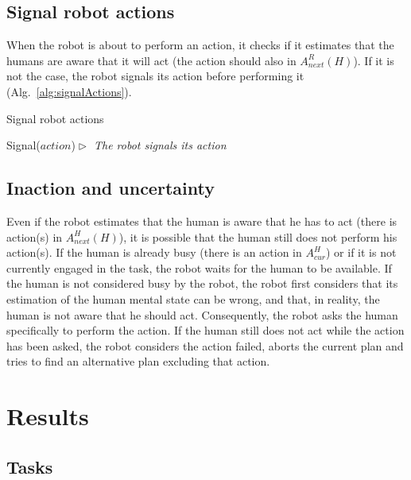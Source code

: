 \documentclass[english,a4paper,11pt,twoside]{StyleThese}
\begin{document}
\subsection{Signal robot actions}

When the robot is about to perform an action, it checks if it estimates that the humans are aware that it will act (the action should also in $A^R_{next}(H)$). If it is not the case, the robot signals its action before performing it (Alg.~\ref{alg:signalActions}).

\begin{algorithm}
\caption{Signal robot actions}
\label{alg:signalActions}
\begin{algorithmic}
\STATE Signal($action$)\hfill \textit{$\vartriangleright$ The robot signals its action}
\ENDIF
\end{algorithmic}
\end{algorithm} 


\subsection{Inaction and uncertainty}

Even if the robot estimates that the human is aware that he has to act (there is action(s) in $A^H_{next}(H)$), it is possible that the human still does not perform his action(s). If the human is already busy (there is an action in $A^H_{cur}$) or if it is not currently engaged in the task, the robot waits for the human to be available. If the human is not considered busy by the robot, the robot first considers that its estimation of the human mental state can be wrong, and that, in reality, the human is not aware that he should act. Consequently, the robot asks the human specifically to perform the action. If the human still does not act while the action has been asked, the robot considers the action failed, aborts the current plan and tries to find an alternative plan excluding that action.


\section{Results}

\label{sec:resultsTOM}

\subsection{Tasks}
\end{document}
